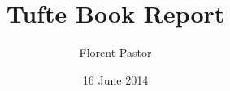 \documentclass[oneside]{book}
\begin{document}
\frontmatter
\title{Tufte Book Report}
\author{Florent Pastor}
\date{16 June 2014}
\maketitle

\mainmatter

\end{document}
